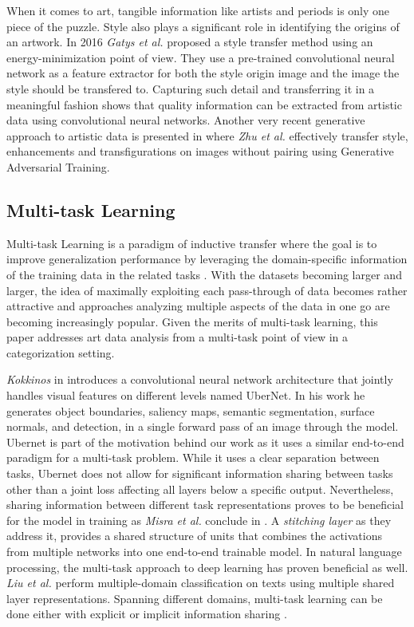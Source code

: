 \documentclass[sigconf]{acmart}
\begin{document}
When it comes to art, tangible information like artists and periods is only one piece of the puzzle. Style also plays a significant role in identifying the origins of an artwork. In 2016 \textit{Gatys et al.}\cite{gatys2016image} proposed a style transfer method using an energy-minimization point of view. They use a pre-trained convolutional neural network \cite{DBLP:journals/corr/SimonyanZ14a} as a feature extractor for both the style origin image and the image the style should be transfered to. Capturing such detail and transferring it in a meaningful fashion shows that quality information can be extracted from artistic data using convolutional neural networks. Another very recent generative approach to artistic data is presented in \cite{CycleGAN2017} where \textit{Zhu et al.} effectively transfer style, enhancements and transfigurations on images without pairing using Generative Adversarial Training. 

\subsection{Multi-task Learning}

Multi-task Learning is a paradigm of inductive transfer where the goal is to improve generalization performance by leveraging the domain-specific information of the training data in the related tasks \cite{caruana1998multitask}. With the datasets becoming larger and larger, the idea of maximally exploiting each pass-through of data becomes rather attractive and approaches analyzing multiple aspects of the data in one go are becoming increasingly popular. Given the merits of multi-task learning, this paper addresses art data analysis from a multi-task point of view in a categorization setting.

\textit{Kokkinos} in \cite{DBLP:journals/corr/Kokkinos16} introduces a convolutional neural network architecture that jointly handles visual features on different levels named UberNet. In his work he generates object boundaries, saliency maps, semantic segmentation, surface normals, and detection, in a single forward pass of an image through the model. Ubernet is part of the motivation behind our work as it uses a similar end-to-end paradigm for a multi-task problem. While it uses a clear separation between tasks, Ubernet does not allow for significant information sharing between tasks other than a joint loss affecting all layers below a specific output. Nevertheless, sharing information between different task representations proves to be beneficial for the model in training as \textit{Misra et al.} conclude in \cite{misra2016cross}. A \textit{stitching layer} as they address it, provides a shared structure of units that combines the activations from multiple networks into one end-to-end trainable model. In natural language processing, the multi-task approach to deep learning has proven beneficial as well. \textit{Liu et al.}\cite{liu2015representation} perform multiple-domain classification on texts using multiple shared layer representations. Spanning different domains, multi-task learning can be done either with explicit \cite{liu2015representation, misra2016cross} or implicit information sharing \cite{DBLP:journals/corr/Kokkinos16}.
\end{document}
